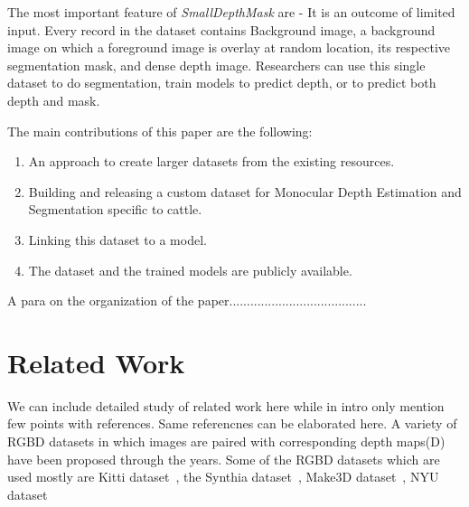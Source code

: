\documentclass{article}
\begin{document}
The most important feature of \textit{SmallDepthMask} are -  It is an outcome of limited input. Every record in the dataset contains Background image, a background image on which a foreground image is overlay at random location, its respective segmentation mask, and dense depth image. Researchers can use this single dataset to do segmentation, train models to predict depth, or to predict both depth and mask. 

The main contributions of this paper are the following:
\begin{enumerate}
\item An approach to create larger datasets from the existing resources.
\item Building and releasing a custom dataset for Monocular Depth Estimation and Segmentation specific to cattle.
\item Linking this dataset to a model.
\item The dataset and the trained models are publicly available.
\end{enumerate}

A para on the organization of the paper.......................................


\section {Related Work}
We can include detailed study of related work here while in intro only mention few points with references. Same referencnes can be elaborated here. 
A variety of RGBD datasets in which images are paired with corresponding depth maps(D) have been proposed through the years.
Some of the RGBD datasets which are used mostly are Kitti dataset~\cite{geiger2013vision}, the Synthia dataset~\cite{ros2016synthia}, 
Make3D dataset~\cite{saxena2008make3d}, NYU dataset~\cite{silberman2012indoor}
\end{document}
